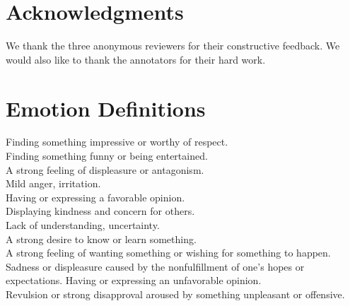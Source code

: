 \documentclass[11pt,a4paper]{article}
\begin{document}
%
 
\section*{Acknowledgments}
We thank the three anonymous reviewers for their constructive feedback. We would also like to thank the annotators for their hard work.







\clearpage
\appendix


\section{Emotion Definitions}
\label{sec:emotion_definitions}
 Finding something impressive or worthy of respect.\\
Finding something funny or being entertained.\\
A strong feeling of displeasure or antagonism.\\
Mild anger, irritation.\\
Having or expressing a favorable opinion.\\
Displaying kindness and concern for others.\\
Lack of understanding, uncertainty.\\
A strong desire to know or learn something.\\
A strong feeling of wanting something or wishing for something to happen.\\
Sadness or displeasure caused by the nonfulfillment of one's hopes or expectations.
Having or expressing an unfavorable opinion.\\
Revulsion or strong disapproval aroused by something unpleasant or offensive.\\
\end{document}
